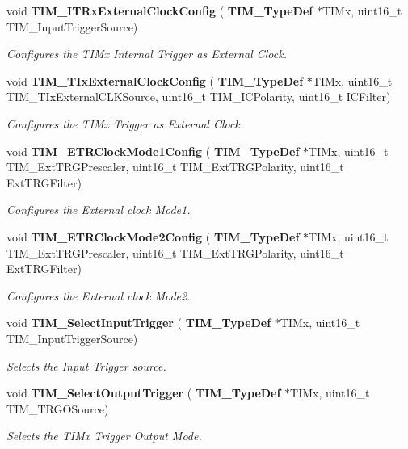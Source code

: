 \begin{DoxyCompactItemize}
void \textbf{ T\+I\+M\+\_\+\+I\+T\+Rx\+External\+Clock\+Config} (\textbf{ T\+I\+M\+\_\+\+Type\+Def} $\ast$T\+I\+Mx, uint16\+\_\+t T\+I\+M\+\_\+\+Input\+Trigger\+Source)
\begin{DoxyCompactList}\small\item\em Configures the T\+I\+Mx Internal Trigger as External Clock. \end{DoxyCompactList}\item 
void \textbf{ T\+I\+M\+\_\+\+T\+Ix\+External\+Clock\+Config} (\textbf{ T\+I\+M\+\_\+\+Type\+Def} $\ast$T\+I\+Mx, uint16\+\_\+t T\+I\+M\+\_\+\+T\+Ix\+External\+C\+L\+K\+Source, uint16\+\_\+t T\+I\+M\+\_\+\+I\+C\+Polarity, uint16\+\_\+t I\+C\+Filter)
\begin{DoxyCompactList}\small\item\em Configures the T\+I\+Mx Trigger as External Clock. \end{DoxyCompactList}\item 
void \textbf{ T\+I\+M\+\_\+\+E\+T\+R\+Clock\+Mode1\+Config} (\textbf{ T\+I\+M\+\_\+\+Type\+Def} $\ast$T\+I\+Mx, uint16\+\_\+t T\+I\+M\+\_\+\+Ext\+T\+R\+G\+Prescaler, uint16\+\_\+t T\+I\+M\+\_\+\+Ext\+T\+R\+G\+Polarity, uint16\+\_\+t Ext\+T\+R\+G\+Filter)
\begin{DoxyCompactList}\small\item\em Configures the External clock Mode1. \end{DoxyCompactList}\item 
void \textbf{ T\+I\+M\+\_\+\+E\+T\+R\+Clock\+Mode2\+Config} (\textbf{ T\+I\+M\+\_\+\+Type\+Def} $\ast$T\+I\+Mx, uint16\+\_\+t T\+I\+M\+\_\+\+Ext\+T\+R\+G\+Prescaler, uint16\+\_\+t T\+I\+M\+\_\+\+Ext\+T\+R\+G\+Polarity, uint16\+\_\+t Ext\+T\+R\+G\+Filter)
\begin{DoxyCompactList}\small\item\em Configures the External clock Mode2. \end{DoxyCompactList}\item 
void \textbf{ T\+I\+M\+\_\+\+Select\+Input\+Trigger} (\textbf{ T\+I\+M\+\_\+\+Type\+Def} $\ast$T\+I\+Mx, uint16\+\_\+t T\+I\+M\+\_\+\+Input\+Trigger\+Source)
\begin{DoxyCompactList}\small\item\em Selects the Input Trigger source. \end{DoxyCompactList}\item 
void \textbf{ T\+I\+M\+\_\+\+Select\+Output\+Trigger} (\textbf{ T\+I\+M\+\_\+\+Type\+Def} $\ast$T\+I\+Mx, uint16\+\_\+t T\+I\+M\+\_\+\+T\+R\+G\+O\+Source)
\begin{DoxyCompactList}\small\item\em Selects the T\+I\+Mx Trigger Output Mode. \end{DoxyCompactList}\item 

\end{DoxyCompactItemize}
